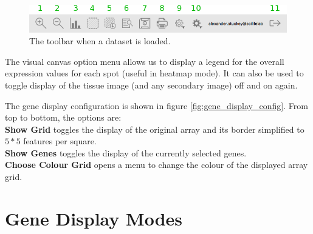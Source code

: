 \documentclass[10pt,a4paper,titlepage]{book}
\begin{document}
\begin{figure}[h]
	\centering
	\includegraphics[width=0.8\linewidth]{./Pictures/toolbar_data_loaded}
	\caption{The toolbar when a dataset is loaded.}
	\label{fig:toolbar_data_loaded}
\end{figure}

The visual canvas option menu allows us to display a legend for the overall expression values for each spot (useful in heatmap mode). It can also be used to toggle display of the tissue image (and any secondary image) off and on again.

The gene display configuration is shown in figure \ref{fig:gene_display_config}. From top to bottom, the options are:\\
\textbf{Show Grid} toggles the display of the original array and its border simplified to $5*5$ features per square.\\
\textbf{Show Genes} toggles the display of the currently selected genes.\\
\textbf{Choose Colour Grid} opens a menu to change the colour of the displayed array grid.\\

\section{Gene Display Modes}
\end{document}
